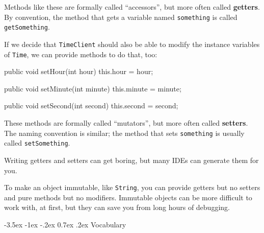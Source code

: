 \documentclass[12pt]{book}
\makeatletter
\theoremstyle{exercise}
\newcommand{\java}[1]{\verb"#1"}
\renewcommand{\section}{\@startsection{section}{1}{\z@}%
    {-3.5ex \@plus -1ex \@minus -.2ex}%
    {0.7ex \@plus.2ex}%
    {\normalfont\Large\bfseries}}
\newcommand{\java}[1]{\lstinline{#1}} %
\makeatother
\begin{document}

Methods like these are formally called ``accessors'', but more often called {\bf getters}.
By convention, the method that gets a variable named \java{something} is called \java{getSomething}.

If we decide that \java{TimeClient} should also be able to modify the instance variables of \java{Time}, we can provide methods to do that, too:

\begin{code}
    public void setHour(int hour) {
        this.hour = hour;
    }

    public void setMinute(int minute) {
        this.minute = minute;
    }

    public void setSecond(int second) {
        this.second = second;
    }
\end{code}

These methods are formally called ``mutators'', but more often called {\bf setters}.
The naming convention is similar; the method that sets \java{something} is usually called \java{setSomething}.


Writing getters and setters can get boring, but many IDEs can generate them for you.


To make an object immutable, like \java{String}, you can provide getters but no setters and pure methods but no modifiers.
Immutable objects can be more difficult to work with, at first, but they can save you from long hours of debugging.


\section{Vocabulary}
\end{document}
